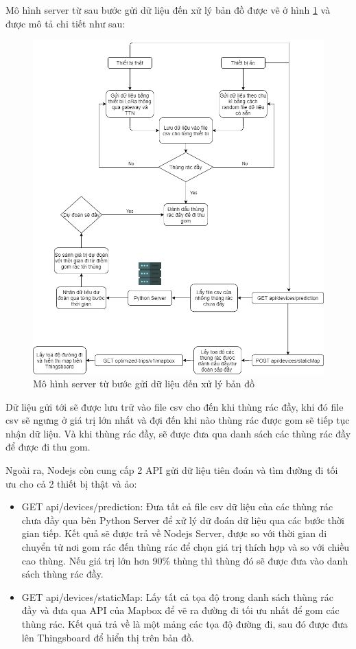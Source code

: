Mô hình server từ sau bước gửi dữ liệu đến xử lý bản đồ được vẽ ở hình \ref{fig:chart_server2} và được mô tả chi tiết như sau:
\begin{figure}[H]
    \centering
    \includegraphics[width=\textwidth]{images/Khanh/Nodejs/Chart_server2.png}
    \caption{Mô hình server từ bước gửi dữ liệu đến xử lý bản đồ}
    \label{fig:chart_server2}
\end{figure}
Dữ liệu gửi tới sẽ được lưu trữ vào file csv cho đến khi thùng rác đầy, khi đó file csv sẽ ngưng ở giá trị lớn nhất và đợi đến khi nào thùng rác được gom sẽ tiếp tục nhận dữ liệu. Và khi thùng rác đầy, sẽ được đưa qua danh sách các thùng rác đầy để được đi thu gom.

Ngoài ra, Nodejs còn cung cấp 2 API gửi dữ liệu tiên đoán và tìm đường đi tối ưu cho cả 2 thiết bị thật và ảo:
\begin{itemize}
    \item GET api/devices/prediction: Đưa tất cả file csv dữ liệu của các thùng rác chưa đầy qua bên Python Server để xử lý dữ đoán dữ liệu qua các bước thời gian tiếp. Kết quả sẽ được trả về Nodejs Server, được so với thời gian di chuyển tử nơi gom rác đến thùng rác để chọn giá trị thích hợp và so với chiều cao thùng. Nếu giá trị lớn hơn 90\% thùng thì thùng đó sẽ được đưa vào danh sách thùng rác đầy.
    \item GET api/devices/staticMap: Lấy tất cả tọa độ trong danh sách thùng rác đầy và đưa qua API của Mapbox để vẽ ra đường đi tối ưu nhất để gom các thùng rác. Kết quả trả về là một mảng các tọa độ đường đi, sau đó được đưa lên Thingsboard để hiển thị trên bản đồ.
\end{itemize}

